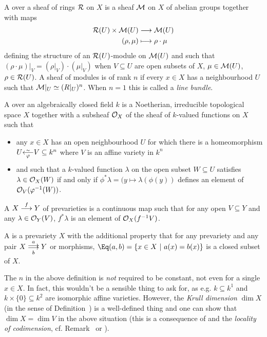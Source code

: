 \documentclass[a4paper,parskip=half,numbers=enddot, DIV=12, headheight=30pt]{scrreprt}
\begin{document}
\begin{defi}
    A  over a sheaf of rings $\mathcal{R}$ on $X$ is a sheaf $\mathcal{M}$ on $X$ of abelian groups together with maps 
    \begin{align*}
        \Rr(U) \times \Mm(U) &\morphism \Mm(U)\\
        (\rho,\mu) &\longmapsto \rho\cdot\mu
    \end{align*}
    defining the structure of an $\mathcal{R}(U)$-module on $\mathcal{M}(U)$ and such that $(\rho\cdot \mu)|_V = (\rho|_V)\cdot (\mu|_V)$ when $V\subseteq U$ are open subsets of $X$, $\mu\in \mathcal{M}(U)$, $\rho \in \mathcal{R}(U)$. A sheaf of modules is  of rank $n$ if every $x\in X$ has a neighbourhood $U$ such that $\mathcal{M}|_U\simeq(R|_U)^n$. When $n=1$ this is called a \emph{line bundle}.
\end{defi}
\begin{defi}[Prevariety]
    A  over an algebraically closed field $k$ is a Noetherian, irreducible topological space $X$ together with a subsheaf $\mathcal{O}_X$ of the sheaf of $k$-valued functions on $X$ such that 
    \begin{itemize}
    	\item any $x\in X$ has an open neighbourhood $U$ for which there is a homeomorphism $U\smash{\lisomorphism[\phi] }V\subseteq k^n$ where $V$ is an affine variety in $k^n$
    	\item and such that a $k$-valued function $\lambda$ on the open subset $W\subseteq U$ satisfies $\lambda \in \mathcal{O}_X(W)$ if and only if $\phi^*\lambda = (y\mapsto \lambda(\phi(y))$ defines an element of $\mathcal{O}_V(\varphi^{-1}(W))$. 
    \end{itemize}
    
    A  $X\morphism[f] Y$ of prevarieties is a continuous map such that for any open $V\subseteq Y$ and any $\lambda \in\mathcal{O}_Y(V)$, $f^*\lambda$ is an element of $\mathcal{O}_X(f^{-1}V)$.
    
    A  is a prevariety $X$ with the additional property that for any prevariety and any pair $X\doublemorphism[a][b] Y$ or morphisms, $\Eq(a,b) = \left\{x\in X\st a(x) = b(x)\right\}$ is a closed subset of $X$.
\end{defi}
\begin{rem}
The $n$ in the above definition is \emph{not} required to be constant, not even for a single $x\in X$. In fact, this wouldn't be a sensible thing to ask for, as e.g. $k\subseteq k^1$ and $k\times\{0\}\subseteq k^2$ are isomorphic affine varieties. However, the \emph{Krull dimension} $\dim X$ (in the sense of Definition~) is a well-defined thing and one can show that $\dim X=\dim V$ in the above situation (this is a consequence of \cite[Theorem~6]{alg1} and the \emph{locality of codimension}, cf. Remark~ or \cite[Remark~2.1.3]{alg1}).
\end{rem}
\end{document}
